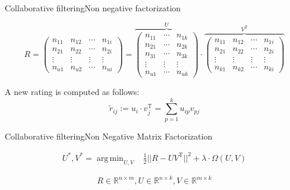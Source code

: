 \documentclass{beamer} %
\DeclareMathOperator*{\argmin}{arg\,min}
\begin{document}
\begin{frame}{Collaborative filtering}{Non negative factorization}

\begin{equation*}
	R = 
  \begin{pmatrix}  
      n_{11} & n_{12} & \cdots & n_{1i} \\
      n_{21} & n_{22} & \cdots & n_{2i} \\     
      \vdots & \vdots & \vdots & \vdots \\
      n_{u1} & n_{u2} & \cdots & n_{ui}
  \end{pmatrix}  =
  \overbrace{
   \begin{pmatrix}  
      n_{11} & \cdots & n_{1k} \\
      n_{21} & \cdots & n_{2k} \\      
      n_{31} & \cdots & n_{3k} \\
      \vdots & \vdots & \vdots \\
      n_{u1} & \cdots & n_{uk}
  \end{pmatrix}
  }^U
  \cdot
  \overbrace{
  \begin{pmatrix}  
      n_{11} & n_{12} & \cdots & n_{1i} \\
      n_{21} & n_{22} & \cdots & n_{2i} \\      
      \vdots & \vdots & \vdots & \vdots \\
      n_{k1} & n_{k2} & \cdots & n_{ki}
  \end{pmatrix}  
  }^{V^\mathrm{T}}
\end{equation*}

A new rating is computed as follows:
$$\tilde{r}_{ij} := u_i \cdot v_j^\mathrm{T} = \sum_{p=1}^{k} u_{ip}v_{pj} $$
      
\end{frame}

\begin{frame}{Collaborative filtering}{Non Negative Matrix Factorization}

  \begin{equation*}
      \begin{split}
       U^*, V^* =  \argmin_{U,V} & \frac{1}{2} ||R - UV^\mathrm{T}||^2 + \lambda \cdot \Omega(U, V) 
    \end{split}
  \end{equation*}
  
  $$R \in \mathbb{R}^{n \times m}, 
  			   U \in \mathbb{R}^{n \times k},
               V \in \mathbb{R}^{m \times k}$$
               	




\end{frame}
\end{document}
